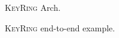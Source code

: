 \documentclass[sigconf]{acmart} %
\providecommand{\sys}{\textsc{KeyRing}} %
\begin{document}
    \begin{figure}[h]
        \centering
        
        \caption{\sys{} Arch.}
\end{figure}

    \begin{figure}[h]
        \centering
        \resizebox{\textwidth}{!}{}
        \caption{\sys{} end-to-end example.}
\end{figure}

   
\end{document}
